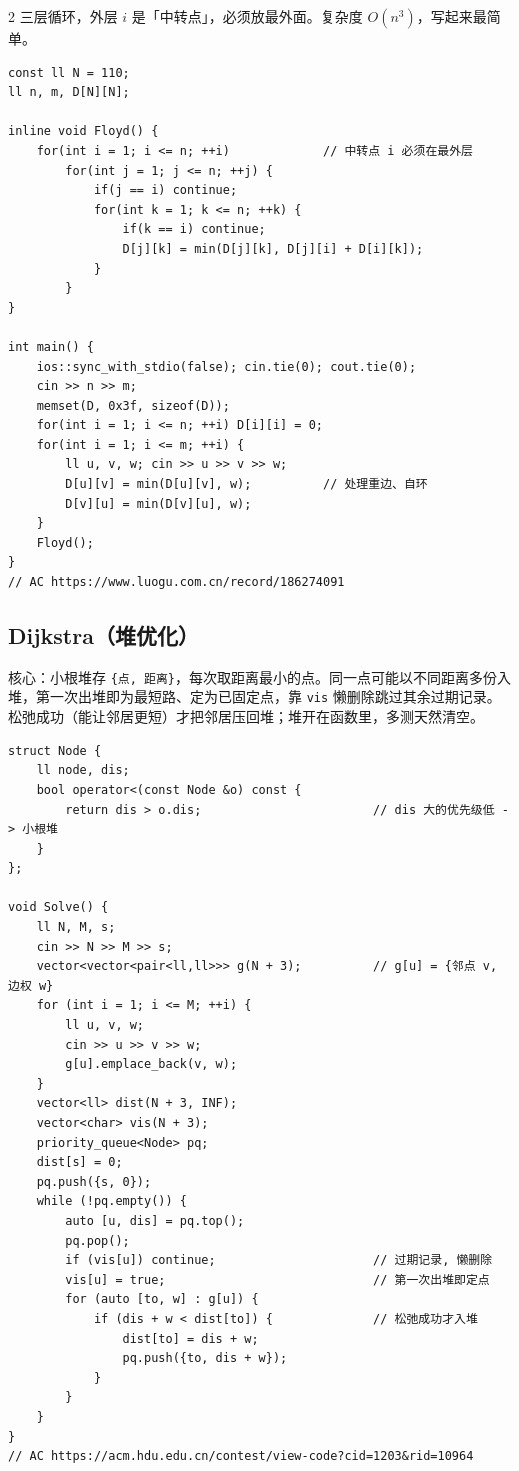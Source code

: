 \begin{multicols*}{2}
		三层循环，外层 $i$ 是「中转点」，必须放最外面。复杂度 $O(n^3)$，写起来最简单。

		\begin{verbatim}
const ll N = 110;
ll n, m, D[N][N];

inline void Floyd() {
    for(int i = 1; i <= n; ++i)             // 中转点 i 必须在最外层
        for(int j = 1; j <= n; ++j) {
            if(j == i) continue;
            for(int k = 1; k <= n; ++k) {
                if(k == i) continue;
                D[j][k] = min(D[j][k], D[j][i] + D[i][k]);
            }
        }
}

int main() {
    ios::sync_with_stdio(false); cin.tie(0); cout.tie(0);
    cin >> n >> m;
    memset(D, 0x3f, sizeof(D));
    for(int i = 1; i <= n; ++i) D[i][i] = 0;
    for(int i = 1; i <= m; ++i) {
        ll u, v, w; cin >> u >> v >> w;
        D[u][v] = min(D[u][v], w);          // 处理重边、自环
        D[v][u] = min(D[v][u], w);
    }
    Floyd();
}
// AC https://www.luogu.com.cn/record/186274091
		\end{verbatim}


		\subsection{Dijkstra（堆优化）}

		核心：小根堆存 \texttt{\{点, 距离\}}，每次取距离最小的点。同一点可能以不同距离多份入堆，第一次出堆即为最短路、定为已固定点，靠 \texttt{vis} 懒删除跳过其余过期记录。松弛成功（能让邻居更短）才把邻居压回堆；堆开在函数里，多测天然清空。

		\begin{verbatim}
struct Node {
    ll node, dis;
    bool operator<(const Node &o) const {
        return dis > o.dis;                        // dis 大的优先级低 -> 小根堆
    }
};

void Solve() {
    ll N, M, s;
    cin >> N >> M >> s;
    vector<vector<pair<ll,ll>>> g(N + 3);          // g[u] = {邻点 v, 边权 w}
    for (int i = 1; i <= M; ++i) {
        ll u, v, w;
        cin >> u >> v >> w;
        g[u].emplace_back(v, w);
    }
    vector<ll> dist(N + 3, INF);
    vector<char> vis(N + 3);
    priority_queue<Node> pq;
    dist[s] = 0;
    pq.push({s, 0});
    while (!pq.empty()) {
        auto [u, dis] = pq.top();
        pq.pop();
        if (vis[u]) continue;                      // 过期记录, 懒删除
        vis[u] = true;                             // 第一次出堆即定点
        for (auto [to, w] : g[u]) {
            if (dis + w < dist[to]) {              // 松弛成功才入堆
                dist[to] = dis + w;
                pq.push({to, dis + w});
            }
        }
    }
}
// AC https://acm.hdu.edu.cn/contest/view-code?cid=1203&rid=10964
		\end{verbatim}



\end{multicols*}
